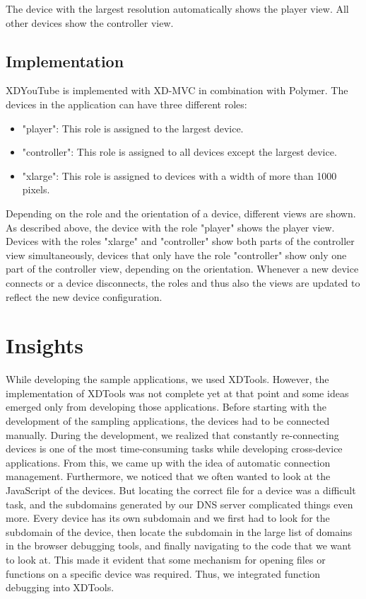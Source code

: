 The device with the largest resolution automatically shows the player view. All other devices show the controller view. 

\subsection{Implementation}

XDYouTube is implemented with XD-MVC in combination with Polymer. The devices in the application can have three different roles:
\begin{itemize}
	\item "player": This role is assigned to the largest device.
	\item "controller": This role is assigned to all devices except the largest device.
	\item "xlarge": This role is assigned to devices with a width of more than 1000 pixels.
\end{itemize}
Depending on the role and the orientation of a device, different views are shown. As described above, the device with the role "player" shows the player view. Devices with the roles "xlarge" and "controller" show both parts of the controller view simultaneously, devices that only have the role "controller" show only one part of the controller view, depending on the orientation. Whenever a new device connects or a device disconnects, the roles and thus also the views are updated to reflect the new device configuration.

\section{Insights}

While developing the sample applications, we used XDTools. However, the implementation of XDTools was not complete yet at that point and some ideas emerged only from developing those applications. Before starting with the development of the sampling applications, the devices had to be connected manually. During the development, we realized that constantly re-connecting devices is one of the most time-consuming tasks while developing cross-device applications. From this, we came up with the idea of automatic connection management. Furthermore, we noticed that we often wanted to look at the JavaScript of the devices. But locating the correct file for a device was a difficult task, and the subdomains generated by our DNS server complicated things even more. Every device has its own subdomain and we first had to look for the subdomain of the device, then locate the subdomain in the large list of domains in the browser debugging tools, and finally navigating to the code that we want to look at. This made it evident that some mechanism for opening files or functions on a specific device was required. Thus, we integrated function debugging into XDTools. 

